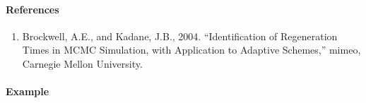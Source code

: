 \paragraph{References}\label{references}

\begin{enumerate}
\def\labelenumi{\arabic{enumi}.}
\itemsep1pt\parskip0pt
\item
  Brockwell, A.E., and Kadane, J.B., 2004. ``Identification of
  Regeneration Times in MCMC Simulation, with Application to Adaptive
  Schemes,'' mimeo, Carnegie Mellon University.
\end{enumerate}

\paragraph{Example}\label{example}


